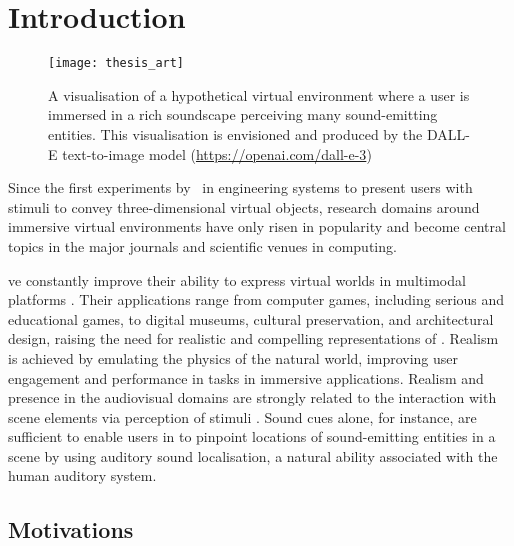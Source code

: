\chapter{Introduction}\label{ch:introduction}


\begin{figure}[tbp]
    \centering
    \texttt{[image: thesis\_art]}
    \caption[Hypothetical virtual environment with a rich soundscape]{A visualisation of a hypothetical virtual environment where a user is immersed in a rich soundscape perceiving many sound-emitting entities. This visualisation is envisioned and produced by the DALL-E text-to-image model (\url{https://openai.com/dall-e-3})}
\end{figure}

Since the first experiments by~\cite{sutherland1968head} in engineering systems to present users with stimuli to convey three-dimensional virtual objects, research domains around immersive virtual environments have only risen in popularity and become central topics in the major journals and scientific venues in computing.\par
\acrfull{ve} constantly improve their ability to express virtual worlds in multimodal platforms \citep{rubio2017immersive}. Their applications range from computer games, including serious and educational games, to digital museums, cultural preservation, and architectural design, raising the need for realistic and compelling representations of . Realism is achieved by emulating the physics of the natural world, improving user engagement and performance in tasks in immersive applications. Realism and presence in the audiovisual domains are strongly related to the interaction with scene elements via perception of stimuli \citep{zimmons2003influence, lokki2005navigation}. Sound cues alone, for instance, are sufficient to enable users in  to pinpoint locations of sound-emitting entities in a scene by using auditory sound localisation, a natural ability associated with the human auditory system.\par
\section{Motivations}
